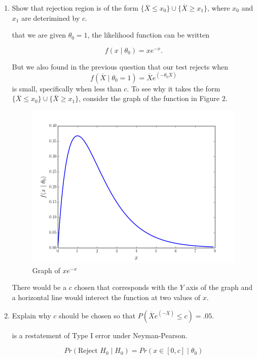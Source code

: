 \documentclass{tufte-book}
\theoremstyle{mytheoremstyle}
\theoremstyle{mylemstyle}
\theoremstyle{mydefstyle}
\begin{document}
\begin{enumerate}

\item Show that rejection region is of the form $\{\overline{X} \leq x_0\} \cup \{ \overline{X} \geq x_1 \}$, where $x_0$ and $x_1$ are deterimined by $c$.

 that we are given $\theta_0=1$, the likelihood function can be written

\[ f(x\mid \theta_0) = xe^{-x}. \]

But we also found in the previous question that our test rejects when
\[ f(\overline{X} \mid \theta_0=1) = \overline{X} e^{(-\theta_0 \overline{X})} \]
is small, specifically when less than $c$.  To see why it takes the form
$\{\overline{X} \leq x_0\} \cup \{ \overline{X} \geq x_1 \}$, consider the graph of the function in Figure 2.

\begin{figure}
\includegraphics{q3}
\caption{Graph of $xe^{-x}$}
\end{figure}

There would be a $c$ chosen that corresponds with the $Y$ axis of the graph and a horizontal line would interect the function at two values of $x$.

\item Explain why $c$ should be chosen so that $P(\overline{X} e^{(-\overline{X})} \leq c) = .05$.

 is a restatement of Type I error under Neyman-Pearson.

\[Pr(\text{Reject }H_0 \mid H_0) = Pr(x \in [0, c] \mid \theta_0) \]


\end{enumerate}
\end{document}
